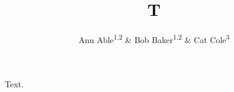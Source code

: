 \documentclass{amsart}
\begin{document}
\title{T}
\author{Ann Able\textsuperscript{1,2} $\&$ Bob Baker\textsuperscript{1,2} $\&$ Cat Cole\textsuperscript{3}}
\address{$1.$ Univ X}
\address{$2.$ Univ Y}
\address{$3.$ Univ Z}
\maketitle
Text.
\end{document}
